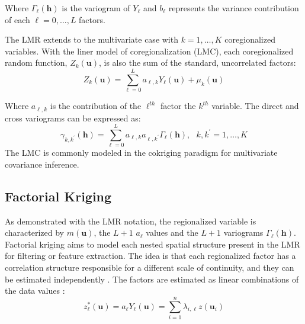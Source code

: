 Where $\Gamma_{\ell}(\mathbf{h})$ is the variogram of $Y_{\ell}$ and $b_{\ell}$ represents the variance contribution of each $\ell=0,\dots,L$ factors.

The LMR extends to the multivariate case with $k=1,\dots,K$ coregionalized variables. With the liner model of coregionalization (LMC), each coregionalized random function, $Z_{k}(\mathbf{u})$, is also the sum of the standard, uncorrelated factors:
\begin{equation*}
    Z_{k}(\mathbf{u}) = \sum_{\ell=0}^{L} a_{\ell, k} Y_{\ell}(\mathbf{u}) + \mu_{k}(\mathbf{u})
\end{equation*}

Where $a_{\ell, k}$ is the contribution of the $\ell^{th}$ factor the $k^{th}$ variable. The direct and cross variograms can be expressed as:
\begin{equation*}
    \gamma_{k,k^{\prime}}(\mathbf{h}) = \sum_{\ell=0}^{L} a_{\ell, k} a_{\ell, k^{\prime}} \Gamma_{\ell}(\mathbf{h}), \ \ \ k,k^{\prime} = 1,\dots,K
\end{equation*}
The LMC is commonly modeled in the cokriging paradigm for multivariate covariance inference.

\subsection{Factorial Kriging}
\label{subsec:01factorial}

As demonstrated with the LMR notation, the regionalized variable is characterized by $m(\mathbf{u})$, the $L + 1$ $a_{\ell}$ values and the $L + 1$ variograms $\Gamma_{\ell}(\mathbf{h})$. Factorial kriging aims to model each nested spatial structure present in the LMR for filtering or feature extraction. The idea is that each regionalized factor has a correlation structure responsible for a different scale of continuity, and they can be estimated independently \citep{matheron1982factorial}. The factors are estimated as linear combinations of the data values \cite{deutsch2007recall}:
\begin{equation*}
    z_{\ell}^{*}(\mathbf{u}) = a_{\ell} Y_{\ell}(\mathbf{u}) = \sum_{i=1}^{n} \lambda_{i, \ell} z(\mathbf{u}_{i})
\end{equation*}


